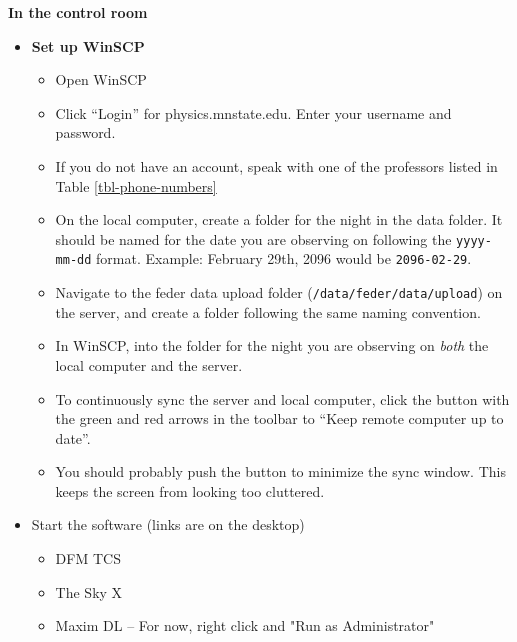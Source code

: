 \documentclass[letterpaper, 12pt]{report}
\begin{document}
{\large\textbf{In the control room}}
\begin{itemize}
	\item \textbf{Set up WinSCP}
	\begin{itemize}
		\item Open WinSCP
		\item Click ``Login'' for physics.mnstate.edu. Enter your username and password.
		\item If you do not have an account, speak with one of the professors listed in Table \ref{tbl-phone-numbers}
		\item On the local computer, create a folder for the night in the data folder. It should be named for the date you are observing on following the \texttt{yyyy-mm-dd} format. Example: February 29th, 2096 would be \texttt{2096-02-29}.
		\item Navigate to the feder data upload folder (\texttt{/data/feder/data/upload}) on the server, and create a folder following the same naming convention.
		\item In WinSCP,  into the folder for the night you are observing on \emph{both} the local computer and the server.
		\item To continuously sync the server and local computer, click the button with the green and red arrows in the toolbar to ``Keep remote computer up to date''.
		\item You should probably push the button to minimize the sync window. This keeps the screen from looking too cluttered.
	\end{itemize}
	\item Start the software (links are on the desktop)
	\begin{itemize}
		\item DFM TCS
		\item The Sky X
		\item Maxim DL -- For now, right click and "Run as Administrator"
	\end{itemize}

\end{itemize}
\end{document}
